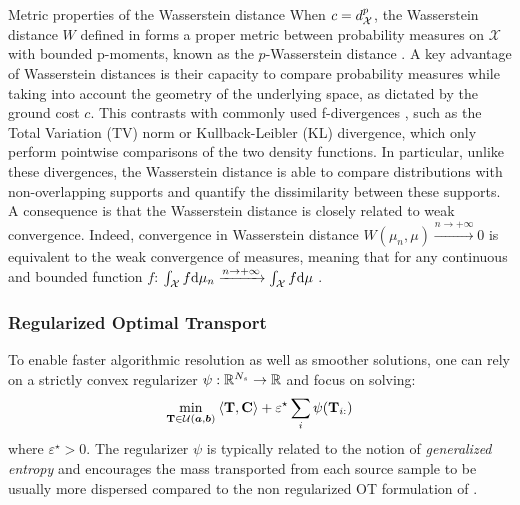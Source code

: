 \begin{mem1}{Metric properties of the Wasserstein distance}
    When \( c = d_{{\mathcal{X}}}^p \), the Wasserstein distance \( W \) defined in  forms a proper metric between probability measures on \( \mathcal{X} \) with bounded p-moments, known as the \( p \)-Wasserstein distance \citep{villani2009optimal}. A key advantage of Wasserstein distances is their capacity to compare probability measures while taking into account the geometry of the underlying space, as dictated by the ground cost \( c \). This contrasts with commonly used f-divergences \citep{csiszar1967information}, such as the Total Variation (TV) norm or Kullback-Leibler (KL) divergence, which only perform pointwise comparisons of the two density functions. In particular, unlike these divergences, the Wasserstein distance is able to compare distributions with non-overlapping supports and quantify the dissimilarity between these supports. A consequence is that the Wasserstein distance is closely related to weak convergence. Indeed, convergence in Wasserstein distance \( W(\mu_n,\mu) \xrightarrow{n \to +\infty} 0 \) is equivalent to the weak convergence of measures, meaning that for any continuous and bounded function $f$: $\int_{{\mathcal{X}}} f \mathrm{d}\mu_n \xrightarrow{n \to +\infty} \int_{{\mathcal{X}}} f \mathrm{d}\mu$ \citep{villani2009optimal}.
\end{mem1}


\subsubsection{Regularized Optimal Transport}

To enable faster algorithmic resolution as well as smoother solutions, one can rely on a strictly convex regularizer $\psi : \mathbb{R}^{N_s} \to \mathbb{R}$ and focus on solving: 
\begin{align}
    \min_{{\mathbf{T}} \in {\mathcal{U}}(\bm{a}, \bm{b})} \: \langle {\mathbf{T}}, \mathbf{C} \rangle + \varepsilon^\star \sum_i \psi({\mathbf{T}}_{i:})
\end{align} 
where $\varepsilon^\star > 0$. The regularizer $\psi$ is typically related to the notion of \emph{generalized entropy} \citep{blondel2020learning} and encourages the mass transported from each source sample to be usually more dispersed compared to the non regularized OT formulation of .

